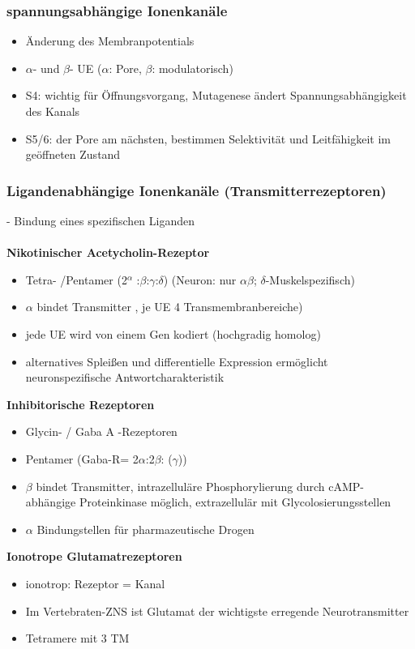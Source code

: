 \subsubsection{spannungsabhängige Ionenkanäle}
\begin{itemize}
	\item Änderung des Membranpotentials
	\item $\alpha$- und $\beta$- UE ($\alpha$: Pore, $\beta$: modulatorisch)
	\item S4: wichtig für Öffnungsvorgang, Mutagenese ändert Spannungsabhängigkeit des Kanals
	\item S5/6: der Pore am nächsten, bestimmen Selektivität und Leitfähigkeit im geöffneten Zustand
\end{itemize}

\subsubsection{Ligandenabhängige Ionenkanäle (Transmitterrezeptoren)}
 - Bindung eines spezifischen Liganden\\
\\
\textbf{Nikotinischer Acetycholin-Rezeptor}
\begin{itemize}
	\item Tetra- /Pentamer (2$^\alpha$ :$\beta$:$\gamma$:$\delta$) (Neuron: nur $\alpha \beta$; $\delta$-Muskelspezifisch)
	\item $\alpha$ bindet Transmitter , je UE 4 Transmembranbereiche)
	\item jede UE wird von einem Gen kodiert (hochgradig homolog)
	\item alternatives Spleißen und differentielle Expression ermöglicht neuronspezifische Antwortcharakteristik
\end{itemize}

\textbf{Inhibitorische Rezeptoren}
\begin{itemize}
	\item Glycin- / Gaba A -Rezeptoren
	\item Pentamer (Gaba-R= 2$\alpha$:2$\beta$: ($\gamma$))
	\item $\beta$ bindet Transmitter, intrazelluläre Phosphorylierung durch cAMP- abhängige Proteinkinase möglich, extrazellulär mit Glycolosierungsstellen
	\item $\alpha$ Bindungstellen für pharmazeutische Drogen
\end{itemize}

\textbf{Ionotrope Glutamatrezeptoren}
\begin{itemize}
	\item ionotrop: Rezeptor = Kanal
	\item Im Vertebraten-ZNS ist Glutamat der wichtigste erregende Neurotransmitter
	\item Tetramere mit 3 TM
\end{itemize}

